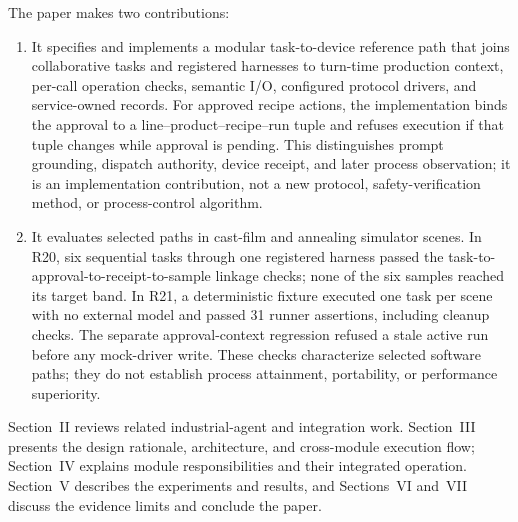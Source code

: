 The paper makes two contributions:
\begin{enumerate}
\item It specifies and implements a modular task-to-device reference path that
  joins collaborative tasks and registered harnesses to turn-time production
  context, per-call operation checks, semantic I/O, configured protocol
  drivers, and service-owned records. For approved recipe actions, the
  implementation binds the approval to a line--product--recipe--run tuple and
  refuses execution if that tuple changes while approval is pending. This
  distinguishes prompt grounding, dispatch authority, device receipt, and
  later process observation; it is an implementation contribution, not a new
  protocol, safety-verification method, or process-control algorithm.
\item It evaluates selected paths in cast-film and annealing simulator scenes.
  In R20, six sequential tasks through one registered harness passed the
  task-to-approval-to-receipt-to-sample linkage checks; none of the six samples
  reached its target band. In R21, a deterministic fixture executed one task
  per scene with no external model and passed 31 runner assertions, including
  cleanup checks. The separate approval-context regression refused a stale
  active run before any mock-driver write. These checks characterize selected
  software paths; they do not establish process attainment, portability, or
  performance superiority.
\end{enumerate}

Section~II reviews related industrial-agent and integration work.
Section~III presents the design rationale, architecture, and cross-module
execution flow; Section~IV explains module responsibilities and their
integrated operation. Section~V describes the experiments and results, and
Sections~VI and~VII discuss the evidence limits and conclude the paper.
